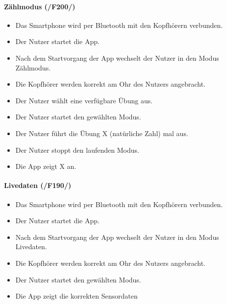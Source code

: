 \documentclass[a4paper,12pt]{article}
\begin{document}
  \paragraph{Zählmodus (/F200/)}
  \begin{itemize}
    \item[] Das Smartphone wird per Bluetooth mit den Kopfhörern verbunden.
    \item[] Der Nutzer startet die App.
    \item[] Nach dem Startvorgang der App wechselt der Nutzer in den Modus \glqq Zählmodus\grqq .
    \item[] Die Kopfhörer werden korrekt am Ohr des Nutzers angebracht.
    \item[] Der Nutzer wählt eine verfügbare Übung aus. 
    \item[] Der Nutzer startet den gewählten Modus.
    \item[] Der Nutzer führt die Übung X (natürliche Zahl) mal aus.
    \item[] Der Nutzer stoppt den laufenden Modus.
    \item[] Die App zeigt X an.
  \end{itemize}

  \paragraph{Livedaten (/F190/)}
  \begin{itemize}
    \item[] Das Smartphone wird per Bluetooth mit den Kopfhörern verbunden.
    \item[] Der Nutzer startet die App.
    \item[] Nach dem Startvorgang der App wechselt der Nutzer in den Modus \glqq Livedaten\grqq .
    \item[] Die Kopfhörer werden korrekt am Ohr des Nutzers angebracht.
    \item[] Der Nutzer startet den gewählten Modus.
    \item[] Die App zeigt die korrekten Sensordaten 
  \end{itemize}
\end{document}
